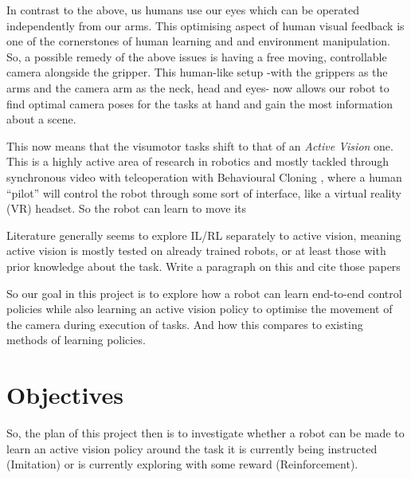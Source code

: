   In contrast to the above, us humans use our eyes which can be operated independently from our arms. This optimising aspect of human visual feedback \cite{findlay2003active,maiello2021humans,goodman2018using} is one of the cornerstones of human learning and and environment manipulation. So, a possible remedy of the above issues is having a free moving, controllable camera alongside the gripper. This human-like setup -with the grippers as the arms and the camera arm as the neck, head and eyes- now allows our robot to find optimal camera poses for the tasks at hand and gain the most information about a scene.
  
  This now means that the visumotor tasks shift to that of an \emph{Active Vision} one. This is a highly active area of research in robotics and mostly tackled through synchronous video with teleoperation \cite{exploringActiveVision2024chuang,?} with Behavioural Cloning \cite{?}, where a human ``pilot'' will control the robot through some sort of interface, like a virtual reality (VR) headset. So the robot can learn to move its  

   Literature generally seems to explore IL/RL separately to active vision, meaning active vision is mostly tested on already trained robots, or at least those with prior knowledge about the task. Write a paragraph on this and cite those papers

  So our goal in this project is to explore how a robot can learn end-to-end control policies while also learning an active vision policy to optimise the movement of the camera during execution of tasks. And how this compares to existing methods of learning policies. 

\section{Objectives}
    So, the plan of this project then is to investigate whether a robot can be made to learn an active vision policy around the task it is currently being instructed (Imitation) or is currently exploring with some reward (Reinforcement).

